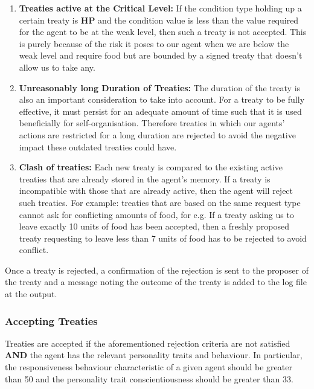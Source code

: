 \begin{enumerate}
    \item 
    \textbf{Treaties active at the Critical Level:} \newline
    If the condition type holding up a certain treaty is \textbf{HP} and the condition value is less than the value required for the agent to be at the weak level, then such a treaty is not accepted. This is purely because of the risk it poses to our agent when we are below the weak level and require food but are bounded by a signed treaty that doesn't allow us to take any.
    
    \item 
    \textbf{Unreasonably long Duration of Treaties:} \newline
    The duration of the treaty is also an important consideration to take into account. For a treaty to be fully effective, it must persist for an adequate amount of time such that it is used beneficially for self-organisation. Therefore treaties in which our agents' actions are restricted for a long duration are rejected to avoid the negative impact these outdated treaties could have. 
    
    \item 
    \textbf{Clash of treaties:} \newline
    Each new treaty is compared to the existing active treaties that are already stored in the agent's memory. If a treaty is incompatible with those that are already active, then the agent will reject such treaties. For example: treaties that are based on the same request type cannot ask for conflicting amounts of food, for e.g. If a treaty asking us to leave exactly 10 units of food has been accepted, then a freshly proposed treaty requesting to leave less than 7 units of food has to be rejected to avoid conflict.

\end{enumerate}

Once a treaty is rejected, a confirmation of the rejection is sent to the proposer of the treaty and a message noting the outcome of the treaty is added to the log file at the output.

\subsubsection{Accepting Treaties}
\label{subsec: Accepting Treaties}

Treaties are accepted if the aforementioned rejection criteria are not satisfied \textbf{AND} the agent has the relevant personality traits and behaviour. In particular, the responsiveness behaviour characteristic of a given agent should be greater than 50 and the personality trait conscientiousness should be greater than 33. 
\newline

